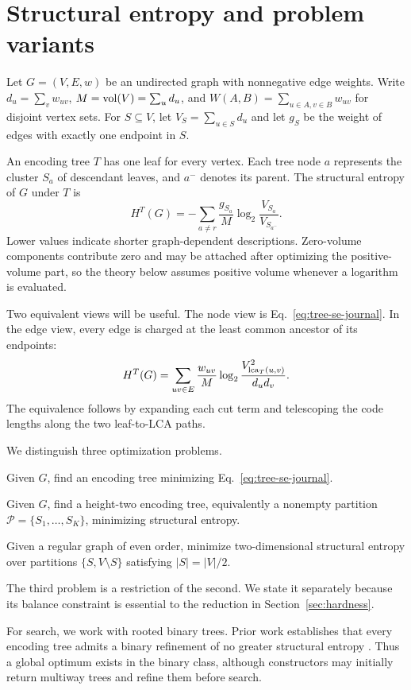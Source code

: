 \section{Structural entropy and problem variants}\label{sec:preliminaries}

Let $G=(V,E,w)$ be an undirected graph with nonnegative edge weights. Write
$d_u=\sum_v w_{uv}$, $M=\operatorname{vol}(V)=\sum_u d_u$, and
$W(A,B)=\sum_{u\in A,v\in B}w_{uv}$ for disjoint vertex sets. For
$S\subseteq V$, let $V_S=\sum_{u\in S}d_u$ and let $g_S$ be the weight of
edges with exactly one endpoint in $S$.

An encoding tree $T$ has one leaf for every vertex. Each tree node $a$
represents the cluster $S_a$ of descendant leaves, and $a^{-}$ denotes its
parent. The structural entropy of $G$ under $T$ is
\begin{equation}
 H^T(G)=-\sum_{a\neq r}\frac{g_{S_a}}{M}
 \log_2\frac{V_{S_a}}{V_{S_{a^-}}}.
 \label{eq:tree-se-journal}
\end{equation}
Lower values indicate shorter graph-dependent descriptions. Zero-volume
components contribute zero and may be attached after optimizing the
positive-volume part, so the theory below assumes positive volume whenever a
logarithm is evaluated.

Two equivalent views will be useful. The node view is
Eq.~\eqref{eq:tree-se-journal}. In the edge view, every edge is charged at the
least common ancestor of its endpoints:
\begin{equation}
 H^T(G)=\sum_{uv\in E}\frac{w_{uv}}{M}
 \log_2\frac{V_{\operatorname{lca}_T(u,v)}^2}{d_ud_v}.
 \label{eq:edge-lca-journal}
\end{equation}
The equivalence follows by expanding each cut term and telescoping the code
lengths along the two leaf-to-LCA paths.

We distinguish three optimization problems.
\begin{problem}
Given $G$, find an encoding tree minimizing Eq.~\eqref{eq:tree-se-journal}.
\end{problem}

\begin{problem}
Given $G$, find a height-two encoding tree, equivalently a nonempty partition
$\mathcal P=\{S_1,\ldots,S_K\}$, minimizing structural entropy.
\end{problem}

\begin{problem}
Given a regular graph of even order, minimize two-dimensional structural
entropy over partitions $\{S,V\setminus S\}$ satisfying $|S|=|V|/2$.
\end{problem}

The third problem is a restriction of the second. We state it separately
because its balance constraint is essential to the reduction in
Section~\ref{sec:hardness}.

For search, we work with rooted binary trees. Prior work establishes that every
encoding tree admits a binary refinement of no greater structural entropy
\cite{zhang2021supertad,pan2025}. Thus a global optimum exists in the binary
class, although constructors may initially return multiway trees and refine
them before search.
